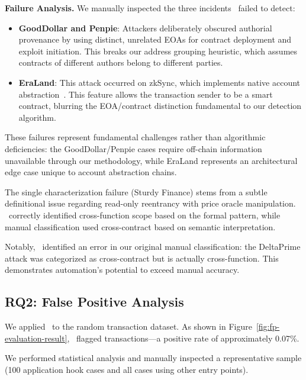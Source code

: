 \textbf{Failure Analysis.} We manually inspected the three incidents \ToolName\ failed to detect:

\begin{itemize}
    \item \textbf{GoodDollar and Penpie}: Attackers deliberately obscured authorial provenance by using distinct, unrelated EOAs for contract deployment and exploit initiation. This breaks our address grouping heuristic, which assumes contracts of different authors belong to different parties.

    \item \textbf{EraLand}: This attack occurred on zkSync, which implements native account abstraction~\cite{zksync-account-abstraction}. This feature allows the transaction sender to be a smart contract, blurring the EOA/contract distinction fundamental to our detection algorithm.
\end{itemize}

These failures represent fundamental challenges rather than algorithmic deficiencies: the GoodDollar/Penpie cases require off-chain information unavailable through our methodology, while EraLand represents an architectural edge case unique to account abstraction chains.

The single characterization failure (Sturdy Finance) stems from a subtle definitional issue regarding read-only reentrancy with price oracle manipulation. \ToolName\ correctly identified cross-function scope based on the formal pattern, while manual classification used cross-contract based on semantic interpretation.

Notably, \ToolName\ identified an error in our original manual classification: the DeltaPrime attack was categorized as cross-contract but is actually cross-function. This demonstrates automation's potential to exceed manual accuracy.

\subsection{RQ2: False Positive Analysis}

We applied \ToolName\ to the random transaction dataset. As shown in Figure~\ref{fig:fp-evaluation-result}, \ToolName\ flagged  transactions---a positive rate of approximately 0.07\%.


We performed statistical analysis and manually inspected a representative sample (100 application hook cases and all  cases using other entry points).

